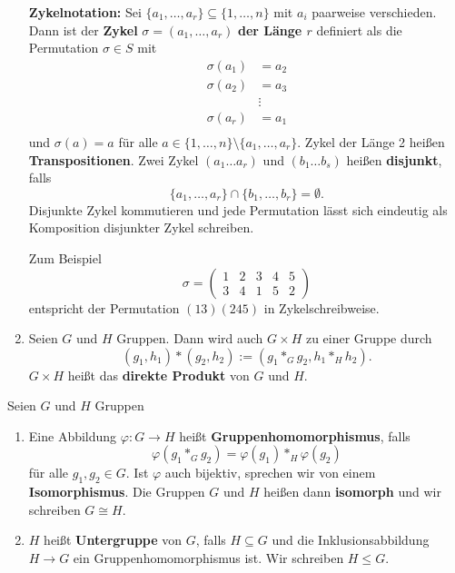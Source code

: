 \begin{rem}
\begin{beispiel}
\begin{enumerate}
			\textbf{Zykelnotation: } Sei $\{a_1, \dots, a_r\} \subseteq \{1, \dots, n\}$ mit $a_i$ paarweise verschieden. Dann ist der \textbf{Zykel} $\sigma = (a_1, \dots, a_r)$ \textbf{der Länge $r$} definiert als die Permutation $\sigma \in S$ mit 
			\begin{align*}
				\sigma(a_1) &= a_2\\
				\sigma(a_2) &= a_3\\
				&\vdots\\
				\sigma(a_r) &= a_1\\
			\end{align*}
			und $\sigma(a) = a$ für alle $a \in \{1, \dots, n\} \setminus \{a_1, \dots, a_r\}$. Zykel der Länge 2 heißen \textbf{Transpositionen}. Zwei Zykel $(a_1 \dots a_r)$ und $(b_1 \dots b_s)$ heißen \textbf{disjunkt}, falls 
			\[\{a_1, \dots, a_r\} \cap \{b_1, \dots, b_r\} = \emptyset.\]
			Disjunkte Zykel kommutieren und jede Permutation lässt sich eindeutig als Komposition disjunkter Zykel schreiben.
			
			Zum Beispiel 
			\[\sigma = \begin{pmatrix}
				1 & 2 & 3 & 4 & 5\\
				3 & 4 & 1 & 5 & 2
			\end{pmatrix}\]
			entspricht der Permutation $(13)(245)$ in Zykelschreibweise.
			
			\item Seien $G$ und $H$ Gruppen. Dann wird auch $G \times H$ zu einer Gruppe durch
			\[(g_1, h_1) * (g_2, h_2) := (g_1 *_G g_2, h_1 *_H h_2).\]
			$G \times H$ heißt das \textbf{direkte Produkt} von $G$ und $H$.
		\end{enumerate}
	\end{beispiel}
\end{rem}
\begin{definition}
	Seien $G$ und $H$ Gruppen
	\begin{enumerate}[label=(\alph*)]
		\item Eine Abbildung $\varphi \colon G \to H$ heißt \textbf{Gruppenhomomorphismus}, falls 
		\[\varphi(g_1 *_G g_2) = \varphi(g_1) *_H \varphi(g_2)\]
		für alle $g_1, g_2 \in G$. Ist $\varphi$ auch bijektiv, sprechen wir von einem \textbf{Isomorphismus}. Die Gruppen $G$ und $H$ heißen dann \textbf{isomorph} und wir schreiben $G \cong H$.
		\item $H$ heißt \textbf{Untergruppe} von $G$, falls $H \subseteq G$ und die Inklusionsabbildung $H \to G$ ein Gruppenhomomorphismus ist. Wir schreiben $H \leq G$.
	\end{enumerate}
\end{definition}

